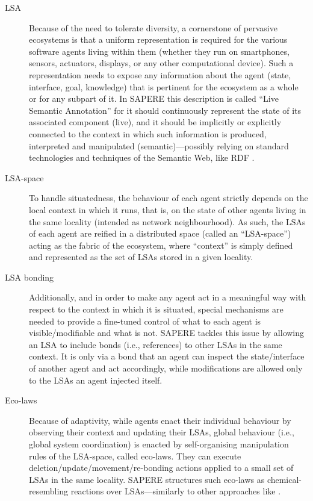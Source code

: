 \documentclass[12pt,a4paper,twoside,openright]{book}
\begin{document}
\begin{description}
 \item[LSA] Because of the need to tolerate diversity, a cornerstone of pervasive ecosystems is that a uniform representation is required for the various software agents living within them (whether they run on smartphones, sensors, actuators, displays, or any other computational device).
 Such a representation needs to expose any information about the agent (state, interface, goal, knowledge) that is pertinent for the ecosystem as a whole or for any subpart of it.
 In SAPERE this description is called ``Live Semantic Annotation'' for it should continuously represent the state of its associated component (live), and it should be implicitly or explicitly connected to the context in which such information is produced, interpreted and manipulated (semantic)—possibly relying on standard technologies and techniques of the Semantic Web, like RDF \cite{manola2004primer}.
 \item[LSA-space] To handle situatedness, the behaviour of each agent strictly depends on the local context in which it runs, that is, on the state of other agents living in the same locality (intended as network neighbourhood).
 As such, the LSAs of each agent are reified in a distributed space (called an “LSA-space”) acting as the fabric of the ecosystem, where “context” is simply defined and represented as the set of LSAs stored in a given locality.
 \item[LSA bonding] Additionally, and in order to make any agent act in a meaningful way with respect to the context in which it is situated, special mechanisms are needed to provide a fine-tuned control of what to each agent is visible/modifiable and what is not.
 SAPERE tackles this issue by allowing an LSA to include bonds (i.e., references) to other LSAs in the same context.
 It is only via a bond that an agent can inspect the state/interface of another agent and act accordingly, while modifications are allowed only to the LSAs an agent injected itself.
 \item[Eco-laws] Because of adaptivity, while agents enact their individual behaviour by observing their context and updating their LSAs, global behaviour (i.e., global system coordination) is enacted by self-organising manipulation rules of the LSA-space, called eco-laws.
 They can execute deletion/update/movement/re-bonding actions applied to a small set of LSAs in the same locality.
 SAPERE structures such eco-laws as chemical-resembling reactions over LSAs—similarly to other approaches like \cite{BanP09,biochemicalTupleSpaces,VCMZ-TAAS2011}.
\end{description}
\end{document}

